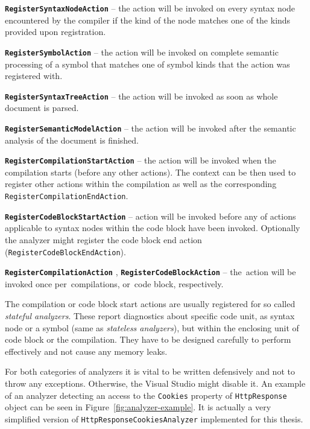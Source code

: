 \documentclass[
  digital, %
  table,   %
  lof,     %
  lot,     %
  oneside,
]{fithesis3}
\begin{document}
\smallskip
\begin{compactitem}
  \item[\texttt{\textbf{RegisterSyntaxNodeAction}}] -- the action will be invoked on every syntax node encountered by the compiler if the kind of the node matches one of the kinds provided upon registration.
  
  \item[\texttt{\textbf{RegisterSymbolAction}}] -- the action will be invoked on complete semantic processing of a symbol that matches one of symbol kinds that the action was registered with.
  
  \item[\texttt{\textbf{RegisterSyntaxTreeAction}}] -- the action will be invoked as soon as whole document is parsed.
  
  \item[\texttt{\textbf{RegisterSemanticModelAction}}] -- the action will be invoked after the semantic analysis of the document is finished.
  
  \item[\texttt{\textbf{RegisterCompilationStartAction}}] -- the action will be invoked when the compilation starts (before any other actions). The context can be then used to register other actions within the compilation as well as the corresponding \texttt{RegisterCompilationEndAction}.
  
  \item[\texttt{\textbf{RegisterCodeBlockStartAction}}] -- action will be invoked before any of actions applicable to syntax nodes within the code block have been invoked. Optionally the analyzer might register the code block end action (\texttt{RegisterCodeBlockEndAction}).
  
  \item[\texttt{\textbf{RegisterCompilationAction}}], \texttt{\textbf{RegisterCodeBlockAction}} -- the~action will be invoked once per~compilations, or~code block, respectively.
\end{compactitem}

The compilation or code block start actions are usually registered for so called \textit{stateful analyzers}. These report diagnostics about specific code unit, as syntax node or a symbol (same as \textit{stateless analyzers}), but within the enclosing unit of code block or the compilation. They have to be designed carefully to perform effectively and not cause any memory leaks.

For both categories of analyzers it is vital to be written defensively and not to throw any exceptions. Otherwise, the Visual Studio might disable it. An example of an analyzer detecting an access to the \texttt{Cookies} property of \texttt{HttpResponse} object can be seen in Figure~\ref{fig:analyzer-example}. It is actually a very simplified version of \texttt{HttpResponseCookiesAnalyzer} implemented for this thesis.
\end{document}
